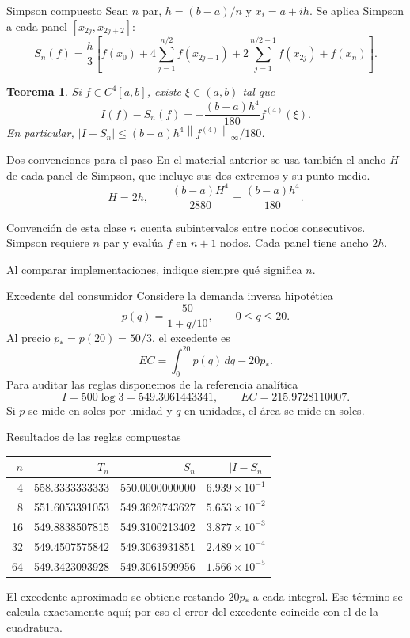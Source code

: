 \documentclass[aspectratio=169,12pt]{beamer}
\newcommand{\norm}[1]{\left\lVert#1\right\rVert}
\newtheorem{thm}{Teorema}
\begin{document}
\begin{frame}{Simpson compuesto}
Sean $n$ par, $h=(b-a)/n$ y $x_i=a+ih$. Se aplica Simpson a cada panel
$[x_{2j},x_{2j+2}]$:
\[\boxed{S_n(f)=\frac h3\left[f(x_0)+4\sum_{j=1}^{n/2}f(x_{2j-1})
+2\sum_{j=1}^{n/2-1}f(x_{2j})+f(x_n)\right].}\]
\begin{thm}
Si $f\in C^4[a,b]$, existe $\xi\in(a,b)$ tal que
\[I(f)-S_n(f)=-\frac{(b-a)h^4}{180}f^{(4)}(\xi).\]
En particular, $|I-S_n|\leq(b-a)h^4\norm{f^{(4)}}_\infty/180$.
\end{thm}
\end{frame}

\begin{frame}{Dos convenciones para el paso}
En el material anterior se usa también el ancho $H$ de cada panel de Simpson,
que incluye sus dos extremos y su punto medio.
\[H=2h,\qquad
\frac{(b-a)H^4}{2880}=\frac{(b-a)h^4}{180}.\]
\begin{block}{Convención de esta clase}
$n$ cuenta subintervalos entre nodos consecutivos. Simpson requiere $n$ par
y evalúa $f$ en $n+1$ nodos. Cada panel tiene ancho $2h$.
\end{block}
Al comparar implementaciones, indique siempre qué significa $n$.
\end{frame}

\begin{frame}{Excedente del consumidor}
Considere la demanda inversa hipotética
\[p(q)=\frac{50}{1+q/10},\qquad0\leq q\leq20.\]
Al precio $p_*=p(20)=50/3$, el excedente es
\[EC=\int_0^{20}p(q)\,dq-20p_*.\]
Para auditar las reglas disponemos de la referencia analítica
\[I=500\log3=549.3061443341,\qquad EC=215.9728110007.\]
Si $p$ se mide en soles por unidad y $q$ en unidades, el área se mide en soles.
\end{frame}

\begin{frame}{Resultados de las reglas compuestas}
\begin{center}\begin{tabular}{rrrr}\toprule
$n$&$T_n$&$S_n$&$|I-S_n|$\\\midrule
4&558.3333333333&550.0000000000&$6.939\times10^{-1}$\\
8&551.6053391053&549.3626743627&$5.653\times10^{-2}$\\
16&549.8838507815&549.3100213402&$3.877\times10^{-3}$\\
32&549.4507575842&549.3063931851&$2.489\times10^{-4}$\\
64&549.3423093928&549.3061599956&$1.566\times10^{-5}$\\\bottomrule
\end{tabular}\end{center}
El excedente aproximado se obtiene restando $20p_*$ a cada integral.
Ese término se calcula exactamente aquí; por eso el error del excedente
coincide con el de la cuadratura.
\end{frame}
\end{document}
